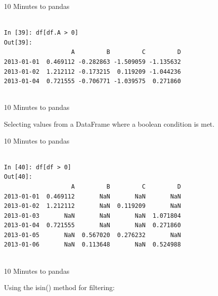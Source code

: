 \documentclass{beamer}
\begin{document}
\begin{frame}[t,fragile]{10 Minutes to pandas}


	\scriptsize
\begin{verbatim}

In [39]: df[df.A > 0]
Out[39]: 
                   A         B         C         D
2013-01-01  0.469112 -0.282863 -1.509059 -1.135632
2013-01-02  1.212112 -0.173215  0.119209 -1.044236
2013-01-04  0.721555 -0.706771 -1.039575  0.271860


\end{verbatim}


\end{frame}


\begin{frame}[t]{10 Minutes to pandas}

Selecting values from a DataFrame where a boolean condition is met.

\end{frame}


\begin{frame}[t,fragile]{10 Minutes to pandas}


	\scriptsize
\begin{verbatim}

In [40]: df[df > 0]
Out[40]: 
                   A         B         C         D
2013-01-01  0.469112       NaN       NaN       NaN
2013-01-02  1.212112       NaN  0.119209       NaN
2013-01-03       NaN       NaN       NaN  1.071804
2013-01-04  0.721555       NaN       NaN  0.271860
2013-01-05       NaN  0.567020  0.276232       NaN
2013-01-06       NaN  0.113648       NaN  0.524988


\end{verbatim}


\end{frame}


\begin{frame}[t]{10 Minutes to pandas}

Using the isin() method for filtering:

\end{frame}
\end{document}
